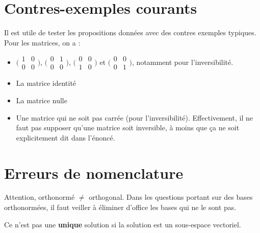 \documentclass[10pt,a4paper]{book}
\begin{document}
\section{Contres-exemples courants}
Il est utile de tester les propositions données avec des contres exemples typiques. Pour les matrices, on a :
\begin{itemize}
\item $\big(\begin{smallmatrix} 
1 & 0\\
0 & 0
\end{smallmatrix}\big)$, 
$\big(\begin{smallmatrix} 
0 & 1\\
0 & 0
\end{smallmatrix}\big)$, 
$\big(\begin{smallmatrix} 
0 & 0\\
1 & 0
\end{smallmatrix}\big)$ et  
$\big(\begin{smallmatrix} 
0 & 0\\
0 & 1
\end{smallmatrix}\big)$, notamment pour l'inversibilité.
\item La matrice identité
\item La matrice nulle
\item Une matrice qui ne soit pas carrée (pour l'inversibilité). Effectivement, il ne faut pas supposer qu'une matrice soit inversible, à moins que ça ne soit explicitement dit dans l'énoncé.
\end{itemize}

\section{Erreurs de nomenclature}
Attention, orthonormé $\neq$ orthogonal. Dans les questions portant sur des bases orthonormées, il faut veiller à éliminer d'office les bases qui ne le sont pas.\par 
Ce n'est pas une \textbf{unique} solution si la solution est un sous-espace vectoriel.

\appendix
\end{document}
